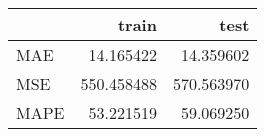 \begin{tabular}{lrr}
\toprule
{} &       train &        test \\
\midrule
MAE  &   14.165422 &   14.359602 \\
MSE  &  550.458488 &  570.563970 \\
MAPE &   53.221519 &   59.069250 \\
\bottomrule
\end{tabular}
